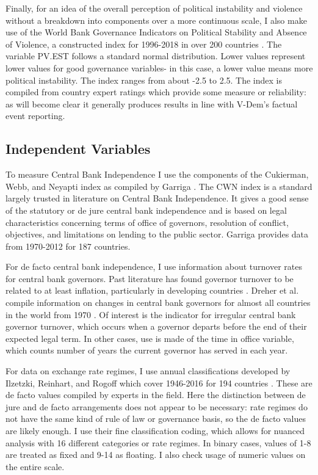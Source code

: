 \documentclass{article}
\begin{document}
    Finally, for an idea of the overall perception of political instability and violence without a breakdown into components over a more continuous scale, I also make use of the World Bank Governance Indicators on Political Stability and Absence of Violence, a constructed index for 1996-2018 in over 200 countries \citep{world_bank_world_2020}. The variable PV.EST follows a standard normal distribution. Lower values represent lower values for good governance variables- in this case, a lower value means more political instability. The index ranges from about -2.5 to 2.5. The index is compiled from country expert ratings which provide some measure or reliability: as will become clear it generally produces results in line with V-Dem’s factual event reporting.

    \subsection*{Independent Variables}

    To measure Central Bank Independence I use the components of the Cukierman, Webb, and Neyapti \citep{cukierman_measuring_1992} index as compiled by Garriga \citep{garriga_central_2016}. The CWN index is a standard largely trusted in literature on Central Bank Independence. It gives a good sense of the statutory or de jure central bank independence and is based on legal characteristics concerning terms of office of governors, resolution of conflict, objectives, and limitations on lending to the public sector. Garriga provides data from 1970-2012 for 187 countries.

    For de facto central bank independence, I use information about turnover rates for central bank governors. Past literature has found governor turnover to be related to at least inflation, particularly in developing countries \citep{cukierman_measuring_1992}. Dreher et al. compile information on changes in central bank governors for almost all countries in the world from 1970 \citep{dreher_when_2010}. Of interest is the indicator for irregular central bank governor turnover, which occurs when a governor departs before the end of their expected legal term. In other cases, use is made of the time in office variable, which counts number of years the current governor has served in each year.

    For data on exchange rate regimes, I use annual classifications developed by Ilzetzki, Reinhart, and Rogoff which cover 1946-2016 for 194 countries \citep{ilzetzki_irr_2019}. These are de facto values compiled by experts in the field. Here the distinction between de jure and de facto arrangements does not appear to be necessary: rate regimes do not have the same kind of rule of law or governance basis, so the de facto values are likely enough. I use their fine classification coding, which allows for nuanced analysis with 16 different categories or rate regimes. In binary cases, values of 1-8 are treated as fixed and 9-14 as floating. I also check usage of numeric values on the entire scale.
\end{document}
